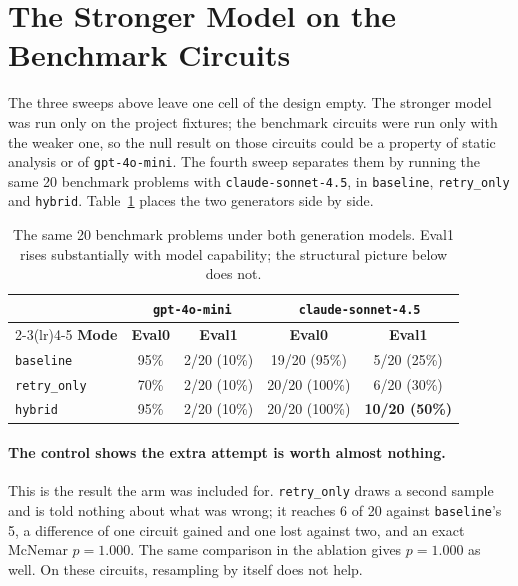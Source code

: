 \documentclass[11pt,a4paper,titlepage=false]{scrreprt}
\begin{document}
\section{The Stronger Model on the Benchmark Circuits}\label{sec:res-strong}

The three sweeps above leave one cell of the design empty. The stronger model was run only on
the project fixtures; the benchmark circuits were run only with the weaker one, so the null
result on those circuits could be a property of static analysis or of
\texttt{gpt-4o-mini}. The fourth sweep separates them by running the same 20 benchmark
problems with \texttt{claude-sonnet-4.5}, in \texttt{baseline}, \texttt{retry\_only} and
\texttt{hybrid}. Table~\ref{tab:strong} places the two generators side by side.

\begin{table}[H]
\centering
\small
\begin{tabular}{@{}l c c c c@{}}
\toprule
 & \multicolumn{2}{c}{\texttt{gpt-4o-mini}} & \multicolumn{2}{c}{\texttt{claude-sonnet-4.5}} \\
\cmidrule(lr){2-3}\cmidrule(lr){4-5}
\textbf{Mode} & \textbf{Eval0} & \textbf{Eval1} & \textbf{Eval0} & \textbf{Eval1} \\
\midrule
\texttt{baseline}    & 95\% & 2/20 (10\%) & 19/20 (95\%)  & 5/20 (25\%) \\
\texttt{retry\_only} & 70\% & 2/20 (10\%) & 20/20 (100\%) & 6/20 (30\%) \\
\texttt{hybrid}      & 95\% & 2/20 (10\%) & 20/20 (100\%) & \textbf{10/20 (50\%)} \\
\bottomrule
\end{tabular}
\caption{The same 20 benchmark problems under both generation models. Eval1 rises
substantially with model capability; the structural picture below does not.}
\label{tab:strong}
\end{table}

\paragraph{The control shows the extra attempt is worth almost nothing.} This is the result
the arm was included for. \texttt{retry\_only} draws a second sample and is told nothing about
what was wrong; it reaches 6 of 20 against \texttt{baseline}'s 5, a difference of one circuit
gained and one lost against two, and an exact McNemar $p=1.000$. The same comparison in the
ablation gives $p=1.000$ as well. On these circuits, resampling by itself does not help.
\end{document}
